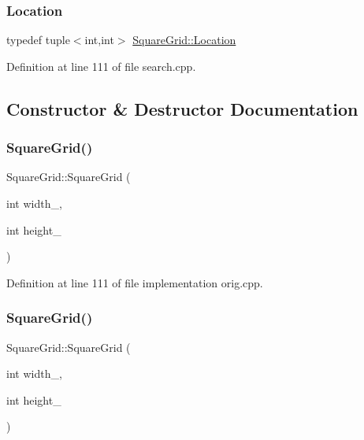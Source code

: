 \subsubsection{\texorpdfstring{Location}{Location}\hspace{0.1cm}{\footnotesize\ttfamily [2/2]}}
{\footnotesize\ttfamily typedef tuple$<$int,int$>$ \mbox{\hyperlink{struct_square_grid_a2c9a2cbd3912aa48ac97289abc3f1c0f}{Square\+Grid\+::\+Location}}}



Definition at line 111 of file search.\+cpp.



\subsection{Constructor \& Destructor Documentation}
\mbox{\label{struct_square_grid_ae5debd1459b89aba9497f270f6d76d7b}} 
\subsubsection{\texorpdfstring{Square\+Grid()}{SquareGrid()}\hspace{0.1cm}{\footnotesize\ttfamily [1/2]}}
{\footnotesize\ttfamily Square\+Grid\+::\+Square\+Grid (\begin{DoxyParamCaption}\item[{int}]{width\+\_\+,  }\item[{int}]{height\+\_\+ }\end{DoxyParamCaption})\hspace{0.3cm}{\ttfamily [inline]}}



Definition at line 111 of file implementation orig.\+cpp.

\mbox{\label{struct_square_grid_ae5debd1459b89aba9497f270f6d76d7b}} 
\subsubsection{\texorpdfstring{Square\+Grid()}{SquareGrid()}\hspace{0.1cm}{\footnotesize\ttfamily [2/2]}}
{\footnotesize\ttfamily Square\+Grid\+::\+Square\+Grid (\begin{DoxyParamCaption}\item[{int}]{width\+\_\+,  }\item[{int}]{height\+\_\+ }\end{DoxyParamCaption})\hspace{0.3cm}{\ttfamily [inline]}}




